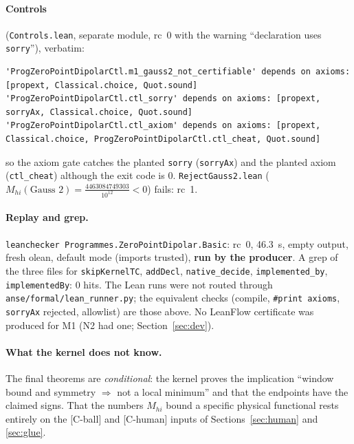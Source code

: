 \documentclass[11pt]{article}
\newcommand{\tier}[1]{\textsf{[#1]}}
\newcommand{\tCb}{\tier{C-ball}}
\newcommand{\tCh}{\tier{C-human}}
\newcommand{\lean}[1]{\texttt{#1}}
\begin{document}
\paragraph{Controls} (\texttt{Controls.lean}, separate module, rc~0 with the warning ``declaration uses \lean{sorry}''), verbatim:
\begin{lstlisting}
'ProgZeroPointDipolarCtl.m1_gauss2_not_certifiable' depends on axioms: [propext, Classical.choice, Quot.sound]
'ProgZeroPointDipolarCtl.ctl_sorry' depends on axioms: [propext, sorryAx, Classical.choice, Quot.sound]
'ProgZeroPointDipolarCtl.ctl_axiom' depends on axioms: [propext, Classical.choice, ProgZeroPointDipolarCtl.ctl_cheat, Quot.sound]
\end{lstlisting}
so the axiom gate catches the planted \lean{sorry} (\lean{sorryAx}) and the planted axiom (\lean{ctl\_cheat}) although the exit code is 0. \texttt{RejectGauss2.lean} ($M_{hi}(\text{Gauss }2)=\tfrac{4463084749303}{10^{12}}<0$) fails: rc~1.

\paragraph{Replay and grep.} \texttt{leanchecker Programmes.ZeroPointDipolar.Basic}: rc~0, 46.3~s, empty output, fresh olean, default mode (imports trusted), \textbf{run by the producer}. A grep of the three files for \lean{skipKernelTC}, \lean{addDecl}, \lean{native\_decide}, \lean{implemented\_by}, \lean{implementedBy}: 0 hits. The Lean runs were not routed through \texttt{anse/formal/lean\_runner.py}; the equivalent checks (compile, \lean{\#print axioms}, \lean{sorryAx} rejected, allowlist) are those above. No LeanFlow certificate was produced for M1 (N2 had one; Section~\ref{sec:dev}).

\paragraph{What the kernel does not know.} The final theorems are \emph{conditional}: the kernel proves the implication ``window bound and symmetry $\Rightarrow$ not a local minimum'' and that the endpoints have the claimed signs. That the numbers $M_{hi}$ bound a specific physical functional rests entirely on the \tCb{} and \tCh{} inputs of Sections~\ref{sec:human} and \ref{sec:glue}.

\end{document}
